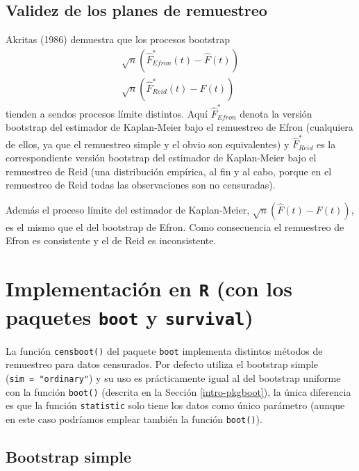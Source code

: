 \documentclass[]{book}
\theoremstyle{break}
\theoremstyle{definition}
\theoremstyle{definition}
\theoremstyle{definition}
\theoremstyle{remark}
\begin{document}
\subsection{Validez de los planes de
remuestreo}\label{validez-de-los-planes-de-remuestreo}

Akritas (1986) demuestra que los procesos bootstrap \[\begin{aligned}
\sqrt{n}\left( \hat{F}^{\ast}_{Efron}\left( t \right) 
- \hat{F}\left( t \right) \right) \\ 
\sqrt{n}\left( \hat{F}^{\ast}_{Reid} \left( t \right) 
- \hat{F}\left( t \right) \right)
\end{aligned}\] tienden a sendos procesos límite distintos. Aquí
\(\hat{F}^{\ast}_{Efron}\) denota la versión bootstrap del estimador de
Kaplan-Meier bajo el remuestreo de Efron (cualquiera de ellos, ya que el
remuestreo simple y el obvio son equivalentes) y
\(\hat{F}^{\ast}_{Reid}\) es la correspondiente versión bootstrap del
estimador de Kaplan-Meier bajo el remuestreo de Reid (una distribución
empírica, al fin y al cabo, porque en el remuestreo de Reid todas las
observaciones son no censuradas).

Además el proceso límite del estimador de Kaplan-Meier,
\(\sqrt{n} \left( \hat{F}\left( t \right) -F\left( t \right) \right)\),
es el mismo que el del bootstrap de Efron. Como consecuencia el
remuestreo de Efron es consistente y el de Reid es inconsistente.

\section{\texorpdfstring{Implementación en \texttt{R} (con los paquetes
\texttt{boot} y
\texttt{survival})}{Implementación en R (con los paquetes boot y survival)}}\label{implementaciuxf3n-en-r-con-los-paquetes-boot-y-survival}

La función \texttt{censboot()} del paquete \texttt{boot} implementa
distintos métodos de remuestreo para datos censurados. Por defecto
utiliza el bootstrap simple (\texttt{sim\ =\ "ordinary"}) y su uso es
prácticamente igual al del bootstrap uniforme con la función
\texttt{boot()} (descrita en la Sección \ref{intro-pkgboot}), la única
diferencia es que la función \texttt{statistic} solo tiene los datos
como único parámetro (aunque en este caso podríamos emplear también la
función \texttt{boot()}).

\subsection{Bootstrap simple}\label{bootstrap-simple}
\end{document}
